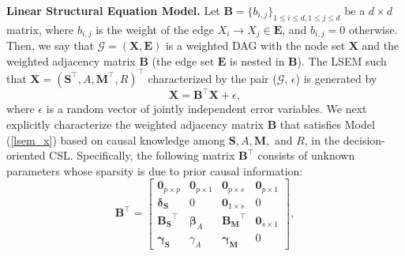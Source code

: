 \noindent\textbf{Linear Structural Equation Model.} 
Let $\boldsymbol{B}=\{b_{i,j}\}_{1\leq i\leq d,1\leq j\leq d}$ be a $d\times d$ matrix, where $b_{i,j}$ is the weight of the edge $X_i\rightarrow X_j \in \mathbf{E}$, and $b_{i,j}=0$ otherwise. Then, we say that $\mathcal{G} =(\boldsymbol{X},\mathbf{E})$ is a weighted DAG with the node set $\boldsymbol{X}$ and the weighted adjacency matrix $\boldsymbol{B}$ (the edge set $\mathbf{E}$ is nested in $\boldsymbol{B}$). The \acrfull{LSEM} \citep{sobel1987direct} such that $\boldsymbol{X} = (\boldsymbol{S}^{\top}, A, \boldsymbol{M}^\top, R)^\top$ characterized by the pair ($\mathcal{G}$, $\epsilon$) is generated by 
\begin{equation}\label{lsem_x}
\boldsymbol{X}=\boldsymbol{B}^\top \boldsymbol{X} +\epsilon,
\end{equation}
where $\epsilon $ is a random vector of jointly independent error variables. 
We next explicitly characterize the weighted adjacency matrix  $\boldsymbol{B}$ that satisfies Model (\ref{lsem_x}) based on causal knowledge among $\boldsymbol{S}, A, \boldsymbol{M},$ and $R$, in the decision-oriented \acrshort{CSL}. Specifically, 
the following matrix  $\boldsymbol{B}^\top$ consists of unknown parameters whose  sparsity is due to prior causal information:
\[\boldsymbol{B}^\top = \begin{bmatrix}
\boldsymbol{0}_{p\times p}&\boldsymbol{0}_{p\times 1}&\boldsymbol{0}_{p\times s}&\boldsymbol{0}_{p\times 1}\\
\boldsymbol{\delta_S}&0&\boldsymbol{0}_{1\times s}&0\\
\boldsymbol{B_S}^\top&\boldsymbol{\beta}_A& \boldsymbol{B_M}^\top&\boldsymbol{0}_{s\times 1}\\
\boldsymbol{\gamma_S}&\gamma_A& \boldsymbol{\gamma_M}&0
\end{bmatrix},\]

